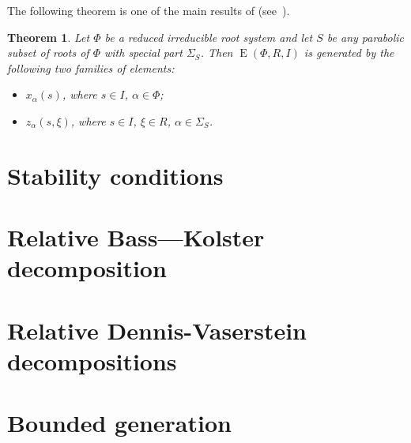 \documentclass[12pt]{amsart}
\numberwithin{equation}{section}
\newcounter{thmcounter} \newcounter{lemmacounter}
\newtheorem{thm}[thmcounter]{Theorem}
\theoremstyle{definition}
\DeclareMathOperator{\E}{E}
\begin{document}
The following theorem is one of the main results of \cite{S} (see~\cite[Theorem~3.4]{S}).
\begin{thm}\label{theorem:Stepanov}
Let $\Phi$ be a reduced irreducible root system and let $S$ be any parabolic subset of roots of $\Phi$ with special part $\Sigma_S$.
Then $\E(\Phi, R, I)$ is generated by the following two families of elements:
\begin{itemize}
 \item $x_{\alpha}(s)$, where $s\in I$, $\alpha\in\Phi$;
 \item $z_\alpha(s,\xi)$, where $s\in I$, $\xi\in R$, $\alpha\in\Sigma_S$. \end{itemize} \end{thm}

\section{Stability conditions}\label{sec:stability-conditions}


\section{Relative Bass---Kolster decomposition}\label{sec:bass-kolster}


\section{Relative Dennis-Vaserstein decompositions}\label{sec:dennis-vaserstein}


\section{Bounded generation}\label{sec:boundgen}


\printbibliography
\end{document}
